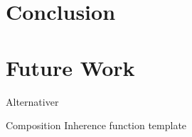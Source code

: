 \section{Conclusion}


\section{Future Work}

Alternativer

Composition
Inherence
function template
